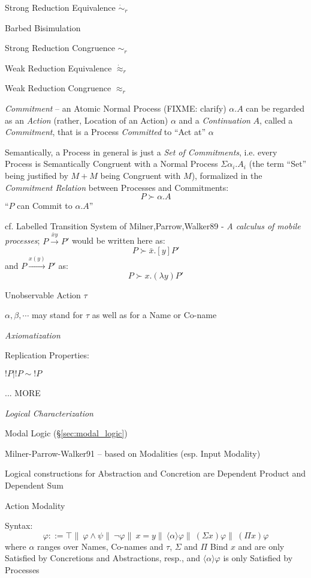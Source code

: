Strong Reduction Equivalence $\dot{\sim}_r$

Barbed Bisimulation

Strong Reduction Congruence $\sim_r$

Weak Reduction Equivalence $\dot{\approx}_r$

Weak Reduction Congruence $\approx_r$


\emph{Commitment} -- an Atomic Normal Process (FIXME: clarify) $\alpha.A$ can be
regarded as an \emph{Action} (rather, Location of an Action) $\alpha$ and a
\emph{Continuation} $A$, called a \emph{Commitment}, that is a Process
\emph{Committed} to ``Act at'' $\alpha$

Semantically, a Process in general is just a \emph{Set of Commitments}, i.e.
every Process is Semantically Congruent with a Normal Process
$\Sigma\alpha_i.A_i$ (the term ``Set'' being justified by $M+M$ being Congruent
with $M$), formalized in the \emph{Commitment Relation} between Processes and
Commitments:
\[
  P \succ \alpha.A
\]
``$P$ can Commit to $\alpha.A$''

cf. Labelled Transition System of Milner,Parrow,Walker89 - \emph{A calculus of
  mobile processes}; $P \xrightarrow{\bar{x}y} P'$ would be written here as:
\[
  P \succ \bar{x}.[y]P'
\]
and $P \xrightarrow{x(y)} P'$ as:
\[
  P \succ x.(\lambda{y})P'
\]

Unobservable Action $\tau$

$\alpha, \beta, \cdots$ may stand for $\tau$ as well as for a Name or Co-name

\emph{Axiomatization}

Replication Properties:

$!P|!P \sim !P$

... MORE

\emph{Logical Characterization}

Modal Logic (\S\ref{sec:modal_logic})

Milner-Parrow-Walker91 -- based on Modalities (esp. Input Modality)

Logical constructions for Abstraction and Concretion are Dependent Product and
Dependent Sum

Action Modality

Syntax:
\[
\varphi ::= \top \|\ \varphi \wedge \psi \|\ \neg\varphi \|\ x=y \|\
  \langle{\alpha}\rangle\varphi \|\ (\Sigma{x})\varphi \|\ (\Pi{x})\varphi
\]
where $\alpha$ ranges over Names, Co-names and $\tau$, $\Sigma$ and
$\Pi$ Bind $x$ and are only Satisfied by Concretions and Abstractions, resp.,
and $\langle{\alpha}\rangle\varphi$ is only Satisfied by Processes

